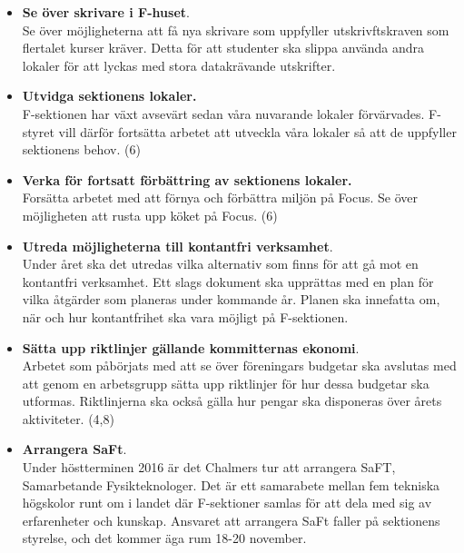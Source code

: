 \documentclass[a4paper]{article}
\begin{document}
\begin{itemize}


\item \textbf{Se över skrivare i F-huset}.\\
Se över möjligheterna att få nya skrivare som uppfyller utskrivftskraven som flertalet kurser kräver. Detta för att studenter ska slippa använda andra lokaler för att lyckas med stora datakrävande utskrifter.  %


\item \textbf{Utvidga sektionens lokaler.} \\
F-sektionen har växt avsevärt sedan våra nuvarande lokaler förvärvades. F-styret vill därför fortsätta arbetet att utveckla våra lokaler så att de uppfyller sektionens behov. (6) %

\item \textbf{Verka för fortsatt förbättring av sektionens lokaler.}\\
Forsätta arbetet med att förnya och förbättra miljön på Focus. Se över möjligheten att rusta upp köket på Focus. (6)

\item \textbf{Utreda möjligheterna till kontantfri verksamhet}.\\
Under året ska det utredas vilka alternativ som finns för att gå mot en kontantfri verksamhet. Ett slags dokument ska upprättas med en plan för vilka åtgärder som planeras under kommande år. Planen ska innefatta om, när och hur kontantfrihet ska vara möjligt på F-sektionen.

\item \textbf{Sätta upp riktlinjer gällande kommitternas ekonomi}.\\
Arbetet som påbörjats med att se över föreningars budgetar ska avslutas med att genom en arbetsgrupp sätta upp riktlinjer för hur dessa budgetar ska utformas. Riktlinjerna ska också gälla hur pengar ska disponeras över årets aktiviteter. (4,8)

\item \textbf{Arrangera SaFt}.\\
Under höstterminen 2016 är det Chalmers tur att arrangera SaFT, Samarbetande Fysikteknologer. Det är ett samarabete mellan fem tekniska högskolor runt om i landet där F-sektioner samlas för att dela med sig av erfarenheter och kunskap. Ansvaret att arrangera SaFt faller på sektionens styrelse, och det kommer äga rum 18-20 november.%


\end{itemize}
\end{document}
